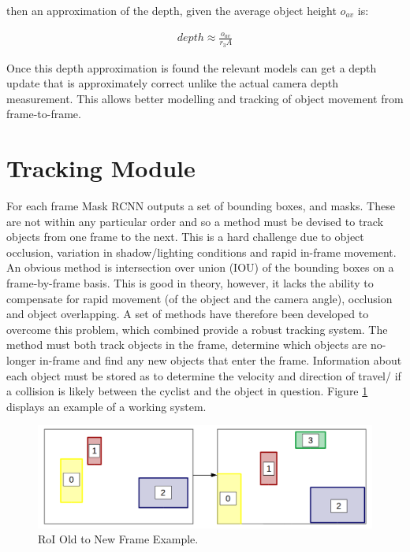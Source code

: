 \documentclass[11pt,twoside]{report}
\begin{document}
then an approximation of the depth, given the average object height $o_{av}$ is:

\begin{equation}
\begin{aligned}
depth \approx \frac{o_{av}}{r_{3}A} 
\end{aligned}
\end{equation}

Once this depth approximation is found the relevant models can get a depth update that is approximately correct unlike the actual camera depth measurement. This allows better modelling and tracking of object movement from frame-to-frame.

\section{Tracking Module}

For each frame Mask RCNN outputs a set of bounding boxes, and masks. These are not within any particular order and so a method must be devised to track objects from one frame to the next. This is a hard challenge due to object occlusion, variation in shadow/lighting conditions and rapid in-frame movement. An obvious method is intersection over union (IOU) of the bounding boxes on a frame-by-frame basis. This is good in theory, however, it lacks the ability to compensate for rapid movement (of the object and the camera angle), occlusion and object overlapping. A set of methods have therefore been developed to overcome this problem, which combined provide a robust tracking system.
\newline \newline
The method must both track objects in the frame, determine which objects are no-longer in-frame and find any new objects that enter the frame. Information about each object must be stored as to determine the velocity and direction of travel/ if a collision is likely between the cyclist and the object in question. Figure \ref{roi_match} displays an example of a working system.

\noindent \begin{figure}[h!]
	\includegraphics[width = 1.0\hsize]{figures/roi_match.png}
	\caption{RoI Old to New Frame Example.}
	\label{roi_match}
\end{figure}
\end{document}
